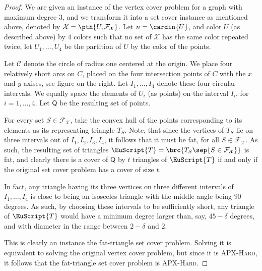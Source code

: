 \documentclass[12pt]{article}
\newcommand{\PntSet}{{\mathsf{Q}}}
\newcommand{\TriSet}{\EuScript{T}}
\providecommand{\ComplexityClass}[1]{{{\textcolor[named]{\si{OliveGreen}}{\textsc{#1}}}}}
\providecommand{\APXHard}{{\ComplexityClass{\si{APX}-Hard}}\xspace}
\newcommand{\Family}{\mathcal{F}}
\begin{document}
\begin{proof}
    We are given an instance of the vertex cover problem for a graph
    with maximum degree $3$, and we transform it into a set cover
    instance as mentioned above, denoted by $\mathcal{X} = \pth{ U,
       \Family_{\mathcal{X}}}$. Let $n = \cardin{U}$, and color $U$
    (as described above) by $4$ colors such that no set of
    $\mathcal{X}$ has the same color repeated twice, let $U_1, \ldots,
    U_4$ be the partition of $U$ by the color of the points.
    
    
    Let $\mathcal{C}$ denote the circle of radius one centered at the
    origin. We place four relatively short arcs on $C$, placed on the
    four intersection points of $C$ with the $x$ and $y$ axises, see
    figure on the right.  Let $I_1, \ldots, I_4$ denote these four
    circular intervals.  We equally space the elements of $U_i$ (as
    points) on the interval $I_{i}$, for $i=1,\ldots, 4$. Let
    $\PntSet$ be the resulting set of points.

    For every set $S \in \Family_{\mathcal{X}}$, take the convex hull
    of the points corresponding to its elements as its representing
    triangle $T_S$. Note, that since the vertices of $T_S$ lie on
    three  intervals out of $I_1, I_2, I_3, I_4$, it follows
    that it must be fat, for all $S \in \Family_{\mathcal{X}}$. As
    such, the resulting set of triangles $\TriSet = \brc{T_S \sep{S
          \in \Family_{\mathcal{X}}}}$ is fat, and clearly there is a
    cover of $\PntSet$ by $t$ triangles of $\TriSet$ if and only if
    the original set cover problem has a cover of size $t$.

    In fact, any triangle having its three vertices on three different
    intervals of $I_1, \ldots, I_4$ is close to being an isosceles
    triangle with the middle angle being $90$ degrees. As such, by
    choosing these intervals to be sufficiently short, any triangle of
    $\TriSet$ would have a minimum degree larger than, say,
    $45-\delta$ degrees, and with diameter in the range between
    $2-\delta$ and $2$.

    This is clearly an instance the fat-triangle set cover
    problem. Solving it is equivalent to solving the original vertex
    cover problem, but since it is \APXHard, it follows that the
    fat-triangle set cover problem is \APXHard.
\end{proof}
\end{document}
